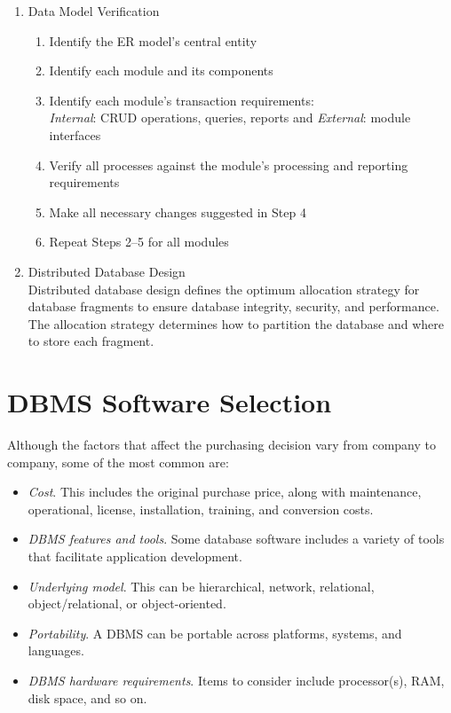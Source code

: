 \documentclass[a4paper, 12pt, titlepage]{report}
\begin{document}
\begin{enumerate}
\item Data Model Verification
\begin{enumerate}
\item Identify the ER model’s central entity
\item Identify each module and its components
\item Identify each module’s transaction requirements: \\ \emph{Internal}: CRUD operations, queries, reports and \emph{External}: module interfaces
\item Verify all processes against the module’s processing and reporting requirements
\item Make all necessary changes suggested in Step 4
\item Repeat Steps 2–5 for all modules
\end{enumerate}
\item Distributed Database Design\\
Distributed database design defines the optimum allocation strategy for database fragments to ensure database integrity, security, and performance. The allocation strategy determines how to partition the database and where to store each fragment.
\end{enumerate}
\section{DBMS Software Selection}
Although the factors that affect the purchasing decision vary from company to company, some of the most common are:
\begin{itemize}
\item \emph{Cost}. This includes the original purchase price, along with maintenance, operational, license, installation, training, and conversion costs.
\item \emph{DBMS features and tools}. Some database software includes a variety of tools that facilitate application development.
\item \emph{Underlying model}. This can be hierarchical, network, relational, object/relational, or object-oriented.
\item \emph{Portability}. A DBMS can be portable across platforms, systems, and languages.
\item \emph{DBMS hardware requirements}. Items to consider include processor(s), RAM, disk space, and so on.
\end{itemize}
\end{document}
